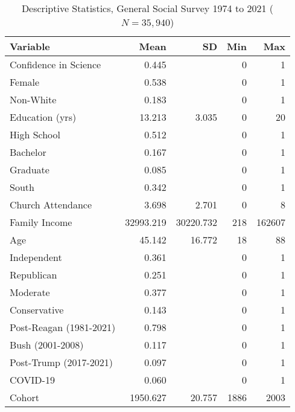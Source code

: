 \begin{table}[ht]
\centering
\caption{Descriptive Statistics, General Social Survey 1974 to 2021 ($N=35,940$)} 
\begin{tabularx}{\textwidth}{Xrrrr}
  \toprule
Variable & Mean & SD & Min & Max \\ 
  \midrule
Confidence in Science & 0.445 &  & 0 & 1 \\ 
  Female & 0.538 &  & 0 & 1 \\ 
  Non-White & 0.183 &  & 0 & 1 \\ 
  Education (yrs) & 13.213 & 3.035 & 0 & 20 \\ 
  High School & 0.512 &  & 0 & 1 \\ 
  Bachelor & 0.167 &  & 0 & 1 \\ 
  Graduate & 0.085 &  & 0 & 1 \\ 
  South & 0.342 &  & 0 & 1 \\ 
  Church Attendance & 3.698 & 2.701 & 0 & 8 \\ 
  Family Income & 32993.219 & 30220.732 & 218 & 162607 \\ 
  Age & 45.142 & 16.772 & 18 & 88 \\ 
  Independent & 0.361 &  & 0 & 1 \\ 
  Republican & 0.251 &  & 0 & 1 \\ 
  Moderate & 0.377 &  & 0 & 1 \\ 
  Conservative & 0.143 &  & 0 & 1 \\ 
  Post-Reagan (1981-2021) & 0.798 &  & 0 & 1 \\ 
  Bush (2001-2008) & 0.117 &  & 0 & 1 \\ 
  Post-Trump (2017-2021) & 0.097 &  & 0 & 1 \\ 
  COVID-19 & 0.060 &  & 0 & 1 \\ 
  Cohort & 1950.627 & 20.757 & 1886 & 2003 \\ 
   \bottomrule
\end{tabularx}
\end{table}
